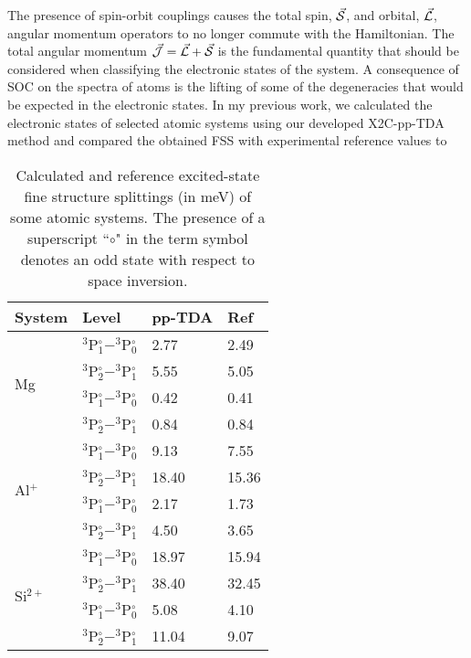 The presence of spin-orbit couplings causes the total spin, $\vec{\mathcal{S}}$, and
orbital, $\vec{\mathcal{L}}$, angular momentum operators to no longer commute with
the Hamiltonian. The total angular momentum
$\vec{\mathcal{J}}=\vec{\mathcal{L}}+\vec{\mathcal{S}}$ is the fundamental quantity that should
be considered when classifying the electronic states of the system.  A
consequence of SOC on the spectra of atoms is the lifting of some of the
degeneracies that would be expected in the electronic states.  In my previous
work, we calculated the electronic states 
of selected atomic systems using our developed X2C-pp-TDA method and compared the
obtained FSS with experimental reference values\cite{NIST_ASD} to
\begin{wraptable}{r}{0.45\textwidth}
  \vspace{-0.5cm}
  \caption{\footnotesize Calculated and reference\cite{NIST_ASD} excited-state fine structure
  splittings (in meV) of some atomic systems. The presence of a superscript
  ``$\circ$" in the term symbol denotes an odd state with respect to space
  inversion.}
 \vspace{-0.3cm}
 \label{tb:SingleEx}
 \centering
 \begin{tabular}{llll}
 System                    & Level                              & pp-TDA & Ref\\
 \hline
 \multirow{4}{*}{Mg}        & $^3$P$^\circ_{1}-^3$P$^\circ_{0}$  & 2.77  & 2.49 \\
                            & $^3$P$^\circ_{2}-^3$P$^\circ_{1}$  & 5.55  & 5.05 \\
                            & $^3$P$^\circ_{1}-^3$P$^\circ_{0}$  & 0.42  & 0.41 \\
                            & $^3$P$^\circ_{2}-^3$P$^\circ_{1}$  & 0.84  & 0.84 \\
 \hline
 \multirow{4}{*}{Al$^+$}    & $^3$P$^\circ_{1}-^3$P$^\circ_{0}$  & 9.13   & 7.55  \\
                            & $^3$P$^\circ_{2}-^3$P$^\circ_{1}$  & 18.40  & 15.36 \\
                            & $^3$P$^\circ_{1}-^3$P$^\circ_{0}$  & 2.17   & 1.73  \\
                            & $^3$P$^\circ_{2}-^3$P$^\circ_{1}$  & 4.50   & 3.65  \\
 \hline
 \multirow{4}{*}{Si$^{2+}$} & $^3$P$^\circ_{1}-^3$P$^\circ_{0}$  & 18.97  & 15.94 \\
                            & $^3$P$^\circ_{2}-^3$P$^\circ_{1}$  & 38.40  & 32.45 \\
                            & $^3$P$^\circ_{1}-^3$P$^\circ_{0}$  & 5.08   & 4.10  \\
                            & $^3$P$^\circ_{2}-^3$P$^\circ_{1}$  & 11.04  & 9.07  \\
 \hline
 \end{tabular}
 \vspace{-0.5cm}
\end{wraptable}
